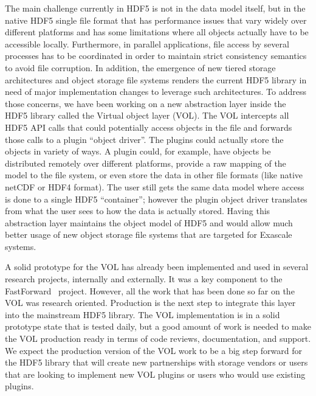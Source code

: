 \documentclass[letterpaper,hyper]{THG_RFC}
\begin{document}
The main challenge currently in HDF5 is not in the data model itself, but in the native HDF5 single file format that has performance issues that vary widely over different platforms and has some limitations where all objects actually have to be accessible locally. Furthermore, in parallel applications, file access by several processes has to be coordinated in order to maintain strict consistency semantics to avoid file corruption. In addition, the emergence of new tiered storage architectures and object storage file systems renders the current HDF5 library in need of major implementation changes to leverage such architectures.
To address those concerns, we have been working on a new abstraction layer inside the HDF5 library called the Virtual object layer (VOL). The VOL intercepts all HDF5 API calls that could potentially access objects in the file and forwards those calls to a plugin ``object driver''. The plugins could actually store the objects in variety of ways. A plugin could, for example, have objects be distributed remotely over different platforms, provide a raw mapping of the model to the file system, or even store the data in other file formats (like native netCDF or HDF4 format). The user still gets the same data model where access is done to a single HDF5 ``container''; however the plugin object driver translates from what the user sees to how the data is actually stored. Having this abstraction layer maintains the object model of HDF5 and would allow much better usage of new object storage file systems that are targeted for Exascale systems. 

A solid prototype for the VOL has already been implemented and used in several research projects, internally and externally. It was a key component to the FastForward~\cite{ffwd} project. However, all the work that has been done so far on the VOL was research oriented. Production is the next step to integrate this layer into the mainstream HDF5 library. The VOL implementation is in a solid prototype state that is tested daily, but a good amount of work is needed to make the VOL production ready in terms of code reviews, documentation, and support. We expect the production version of the VOL work to be a big step forward for the HDF5 library that will create new partnerships with storage vendors or users that are looking to implement new VOL plugins or users who would use existing plugins.
\end{document}
